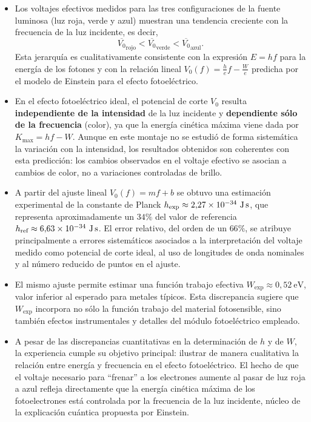 \documentclass[11pt,twocolumn]{article}
\begin{document}
\begin{itemize}
  \item Los voltajes efectivos medidos para las tres configuraciones de
        la fuente luminosa (luz roja, verde y azul) muestran una
        tendencia creciente con la frecuencia de la luz incidente, es
        decir,
        \[
            \overline{V_0}_{\text{rojo}} < \overline{V_0}_{\text{verde}} <
            \overline{V_0}_{\text{azul}}.
        \]
        Esta jerarquía es cualitativamente consistente con la expresión
        $E = hf$ para la energía de los fotones y con la relación
        lineal $V_0(f) = \tfrac{h}{e}f - \tfrac{W}{e}$ predicha por el
        modelo de Einstein para el efecto fotoeléctrico.

  \item En el efecto fotoeléctrico ideal, el potencial de corte $V_0$
        resulta \textbf{independiente de la intensidad} de la luz
        incidente y \textbf{dependiente sólo de la frecuencia} (color),
        ya que la energía cinética máxima viene dada por
        $K_{\max} = hf - W$. Aunque en este montaje no se estudió
        de forma sistemática la variación con la intensidad, los
        resultados obtenidos son coherentes con esta predicción: los
        cambios observados en el voltaje efectivo se asocian a cambios
        de color, no a variaciones controladas de brillo.

  \item A partir del ajuste lineal $V_0(f) = mf + b$ se obtuvo una
        estimación experimental de la constante de Planck
        $h_{\text{exp}} \approx 2{,}27\times 10^{-34}~\text{J\,s}$,
        que representa aproximadamente un $34\%$ del valor de
        referencia $h_{\text{ref}} \approx 6{,}63\times 10^{-34}~\text{J\,s}$.
        El error relativo, del orden de un $66\%$, se atribuye
        principalmente a errores sistemáticos asociados a la
        interpretación del voltaje medido como potencial de corte ideal,
        al uso de longitudes de onda nominales y al número reducido de
        puntos en el ajuste.

  \item El mismo ajuste permite estimar una función trabajo efectiva
        $W_{\text{exp}} \approx 0{,}52~\text{eV}$, valor inferior al
        esperado para metales típicos. Esta discrepancia sugiere que
        $W_{\text{exp}}$ incorpora no sólo la función trabajo del
        material fotosensible, sino también efectos instrumentales y
        detalles del módulo fotoeléctrico empleado.

  \item A pesar de las discrepancias cuantitativas en la determinación
        de $h$ y de $W$, la experiencia cumple su objetivo principal:
        ilustrar de manera cualitativa la relación entre energía y
        frecuencia en el efecto fotoeléctrico. El hecho de que el
        voltaje necesario para “frenar” a los electrones aumente al
        pasar de luz roja a azul refleja directamente que la energía
        cinética máxima de los fotoelectrones está controlada por la
        frecuencia de la luz incidente, núcleo de la explicación
        cuántica propuesta por Einstein.
\end{itemize}




\begingroup
\raggedright
\sloppy
\printbibliography
\endgroup
\end{document}
